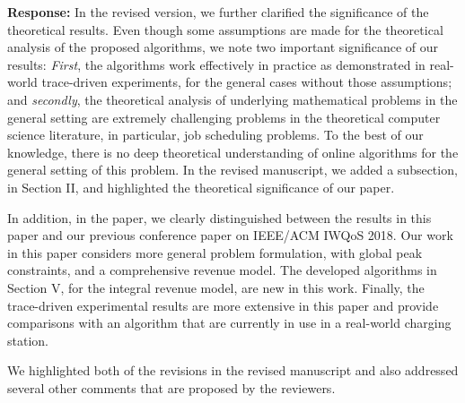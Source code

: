 \documentclass[11pt]{article}
\begin{document}
\vspace{5mm}
\noindent\textbf{Response:}
In the revised version, we further clarified the significance of the theoretical results. Even though some assumptions are made for the theoretical analysis of the proposed algorithms, we note two important significance of our results: \textit{First}, the algorithms work effectively in practice as demonstrated in real-world trace-driven experiments, for the general cases without those assumptions; and \textit{secondly}, the theoretical analysis of underlying mathematical problems in the general setting are extremely challenging problems in the theoretical computer science literature, in particular, job scheduling problems. To the best of our knowledge, there is no deep theoretical understanding of online algorithms for the general setting of this problem. In the revised manuscript, we added a subsection, in Section II, and highlighted the theoretical significance of our paper. 

In addition, in the paper, we clearly distinguished between the results in this paper and our previous conference paper on IEEE/ACM IWQoS 2018. Our work in this paper considers more general problem formulation, with global peak constraints, and a comprehensive revenue model. The developed algorithms in Section V, for the integral revenue model, are new in this work. Finally, the trace-driven experimental results are more extensive in this paper and provide comparisons with an algorithm that are currently in use in a real-world charging station. 

We highlighted both of the revisions in the revised manuscript and also addressed several other comments that are proposed by the reviewers. 



\newpage
\end{document}
